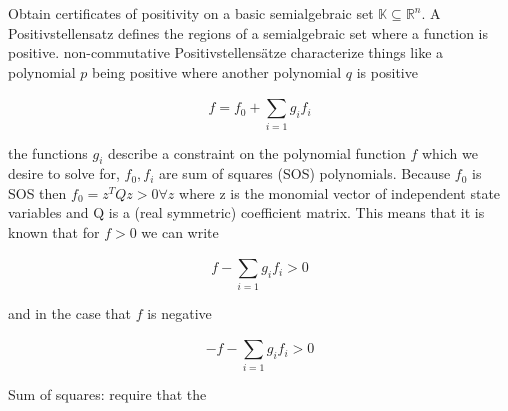 Obtain certificates of positivity on a basic semialgebraic set $\mathbb{K}\subseteq\mathbb{R}^n$. \citep{bib:sos_putinar_laurent}
A Positivstellensatz defines the regions of a semialgebraic set where a function is positive. 
non-commutative Positivstellens\"{a}tze characterize things like a polynomial $p$ being positive where another polynomial $q$ is positive


\begin{equation}
f = f_0 + \sum\limits_{i=1}^{}g_i f_i
\end{equation}

the functions $g_i$ describe a constraint on the polynomial function $f$ which we desire to solve for, $f_0,f_i$ are sum of squares (SOS) polynomials. Because $f_0$ is SOS then $f_0=z^TQz>0 \forall z$ where z is the monomial vector of independent state variables and Q is a (real symmetric) coefficient matrix. This means that it is known that for $f>0$ we can write

\begin{equation}
f - \sum\limits_{i=1}^{}g_i f_i >0
\end{equation}

and in the case that $f$ is negative

\begin{equation}
-f - \sum\limits_{i=1}^{}g_i f_i >0
\end{equation}


Sum of squares: require that the 